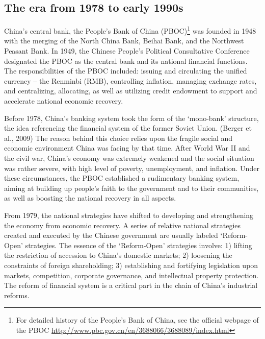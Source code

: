 \documentclass[
  letterpaper,
  DIV=11,
  numbers=noendperiod]{scrreprt}
\begin{document}
\subsection{The era from 1978 to early
1990s}\label{the-era-from-1978-to-early-1990s}

China's central bank, the People's Bank of China (PBOC)\footnote{For
  detailed history of the People's Bank of China, see the official
  webpage of the PBOC
  \url{http://www.pbc.gov.cn/en/3688066/3688089/index.html}} was founded
in 1948 with the merging of the North China Bank, Beihai Bank, and the
Northwest Peasant Bank. In 1949, the Chinese People's Political
Consultative Conference designated the PBOC as the central bank and its
national financial functions. The responsibilities of the PBOC included:
issuing and circulating the unified currency -- the Renminbi (RMB),
controlling inflation, managing exchange rates, and centralizing,
allocating, as well as utilizing credit endowment to support and
accelerate national economic recovery.

Before 1978, China's banking system took the form of the `mono-bank'
structure, the idea referencing the financial system of the former
Soviet Union. (Berger et al., 2009) The reason behind this choice relies
upon the fragile social and economic environment China was facing by
that time. After World War II and the civil war, China's economy was
extremely weakened and the social situation was rather severe, with high
level of poverty, unemployment, and inflation. Under these
circumstances, the PBOC established a rudimentary banking system, aiming
at building up people's faith to the government and to their
communities, as well as boosting the national recovery in all aspects.

From 1979, the national strategies have shifted to developing and
strengthening the economy from economic recovery. A series of relative
national strategies created and executed by the Chinese government are
usually labeled `Reform-Open' strategies. The essence of the
`Reform-Open' strategies involve: 1) lifting the restriction of
accession to China's domestic markets; 2) loosening the constraints of
foreign shareholding; 3) establishing and fortifying legislation upon
markets, competition, corporate governance, and intellectual property
protection. The reform of financial system is a critical part in the
chain of China's industrial reforms.
\end{document}

